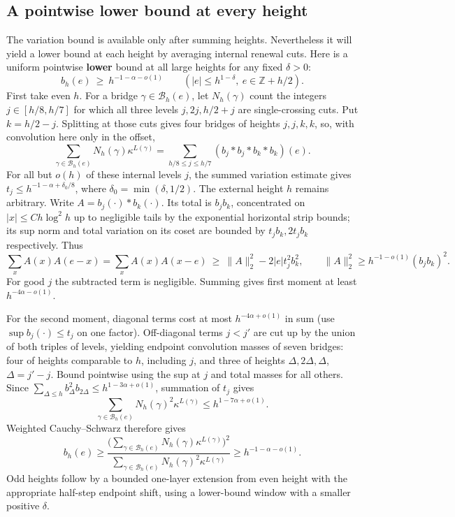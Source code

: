 \documentclass[11pt]{article}
\numberwithin{equation}{section}
\theoremstyle{definition}\newtheorem{definition}[theorem]{Definition}
\theoremstyle{remark}\newtheorem{remark}[theorem]{Remark}
\begin{document}
\subsection{A pointwise lower bound at every height}
The variation bound is available only after summing heights. Nevertheless
it will yield a lower bound at each height by averaging internal renewal
cuts. Here is a uniform pointwise \textbf{lower} bound at all large heights for any fixed \(\delta>0\):
\[
 b_h(e)\ \ge\ h^{-1-\alpha-o(1)} \qquad (|e|\le h^{1-\delta},\ e\in\mathbb Z+h/2).
\]
First take even \(h\). For a bridge \(\gamma\in\mathcal B_h(e)\), let
\(N_h(\gamma)\) count the integers \(j\in[h/8,h/7]\) for which all
three levels \(j,2j,h/2+j\) are single-crossing cuts. Put
\(k=h/2-j\). Splitting at those cuts gives four bridges of heights
\(j,j,k,k\), so, with convolution here only in the offset,
\[
 \sum_{\gamma\in\mathcal B_h(e)}N_h(\gamma)\kappa^{L(\gamma)}
 =\sum_{h/8\le j\le h/7}(b_j*b_j*b_k*b_k)(e).
\]
For all but \(o(h)\) of these internal levels \(j\), the summed
variation estimate gives \(t_j\le h^{-1-\alpha+\delta_0/8}\), where
\(\delta_0=\min(\delta,1/2)\). The external height \(h\) remains
arbitrary. Write \(A=b_j(\cdot)*b_k(\cdot)\). Its total is
\(b_j b_k\), concentrated on \(|x|\le Ch\log^2 h\) up to negligible
tails by the exponential horizontal strip bounds; its sup norm and total
variation on its coset are bounded by \(t_j b_k,2t_j b_k\)
respectively. Thus
\[
 \sum_x A(x)A(e-x)
 =\sum_x A(x)A(x-e)\ \ge\ \|A\|_2^2-2|e|t_j^2 b_k^2,
 \qquad
 \|A\|_2^2\ge h^{-1-o(1)}(b_jb_k)^2.
\]
For good \(j\) the subtracted term is negligible. Summing gives first moment at least \(h^{-4\alpha-o(1)}\).

For the second moment, diagonal terms cost at most \(h^{-4\alpha+o(1)}\) in sum (use \(\sup b_j(\cdot)\le t_j\) on one factor). Off-diagonal terms \(j<j'\) are cut up by the union of both triples of levels, yielding endpoint convolution masses of seven bridges: four of heights comparable to \(h\), including \(j\), and three of heights \(\Delta,2\Delta,\Delta\), \(\Delta=j'-j\). Bound pointwise using the sup at \(j\) and total masses for all others. Since \(\sum_{\Delta\le h}b_\Delta^2 b_{2\Delta}\le h^{1-3\alpha+o(1)}\), summation of \(t_j\) gives
\[
 \sum_{\gamma\in\mathcal B_h(e)}N_h(\gamma)^2\kappa^{L(\gamma)}
 \le h^{1-7\alpha+o(1)}.
\]
Weighted Cauchy--Schwarz therefore gives
\[
 b_h(e)\ge
 \frac{\bigl(\sum_{\gamma\in\mathcal B_h(e)}
 N_h(\gamma)\kappa^{L(\gamma)}\bigr)^2}
 {\sum_{\gamma\in\mathcal B_h(e)}
 N_h(\gamma)^2\kappa^{L(\gamma)}}
 \ge h^{-1-\alpha-o(1)}.
\]
Odd heights follow by a bounded one-layer extension from even height
with the appropriate half-step endpoint shift, using a lower-bound
window with a smaller positive \(\delta\).
\end{document}
